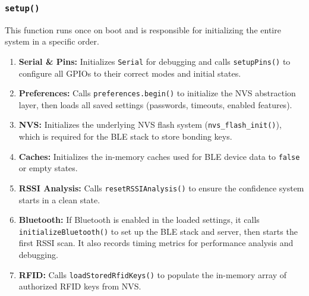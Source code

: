 \documentclass{article}
\begin{document}
\subsubsection{\texttt{setup()}}
This function runs once on boot and is responsible for initializing the entire system in a specific order.
\begin{enumerate}
    \item \textbf{Serial \& Pins:} Initializes \texttt{Serial} for debugging and calls \texttt{setupPins()} to configure all GPIOs to their correct modes and initial states.
    \item \textbf{Preferences:} Calls \texttt{preferences.begin()} to initialize the NVS abstraction layer, then loads all saved settings (passwords, timeouts, enabled features).
    \item \textbf{NVS:} Initializes the underlying NVS flash system (\texttt{nvs\_flash\_init()}), which is required for the BLE stack to store bonding keys.
    \item \textbf{Caches:} Initializes the in-memory caches used for BLE device data to \texttt{false} or empty states.
    \item \textbf{RSSI Analysis:} Calls \texttt{resetRSSIAnalysis()} to ensure the confidence system starts in a clean state.
    \item \textbf{Bluetooth:} If Bluetooth is enabled in the loaded settings, it calls \texttt{initializeBluetooth()} to set up the BLE stack and server, then starts the first RSSI scan. It also records timing metrics for performance analysis and debugging.
    \item \textbf{RFID:} Calls \texttt{loadStoredRfidKeys()} to populate the in-memory array of authorized RFID keys from NVS.
\end{enumerate}
\end{document}
